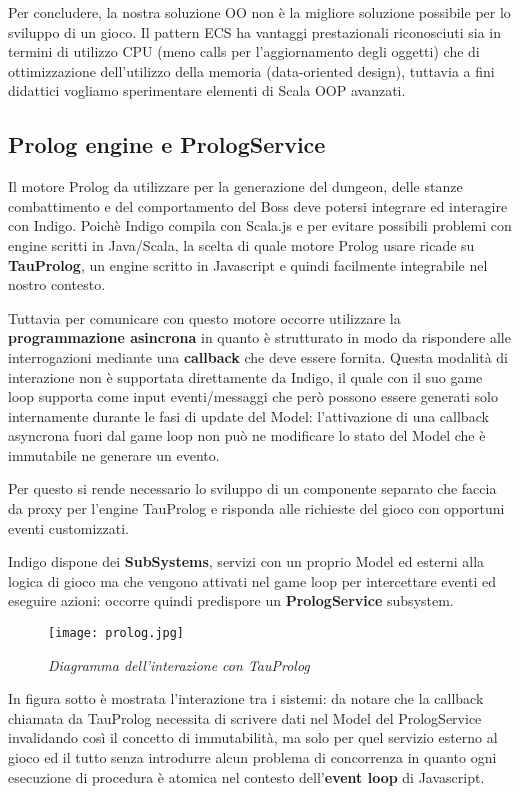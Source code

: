 Per concludere, la nostra soluzione OO non è la migliore soluzione possibile per lo sviluppo di un gioco. Il pattern ECS ha vantaggi prestazionali riconosciuti sia in termini di utilizzo CPU (meno calls per l'aggiornamento degli oggetti) che di ottimizzazione dell'utilizzo della memoria (data-oriented design), tuttavia a fini didattici vogliamo sperimentare elementi di Scala OOP avanzati.

\subsection{Prolog engine e PrologService}
Il motore Prolog da utilizzare per la generazione del dungeon, delle stanze combattimento e del comportamento del Boss deve potersi integrare ed interagire con Indigo.
Poichè Indigo compila con Scala.js e per evitare possibili problemi con engine scritti in Java/Scala, la scelta di quale motore Prolog usare ricade su \textbf{TauProlog}, un engine scritto in Javascript e quindi facilmente integrabile nel nostro contesto.

Tuttavia per comunicare con questo motore occorre utilizzare la \textbf{programmazione asincrona} in quanto è strutturato in modo da rispondere alle interrogazioni mediante una \textbf{callback} che deve essere fornita.
Questa modalità di interazione non è supportata direttamente da Indigo, il quale con il suo game loop supporta come input eventi/messaggi che però possono essere generati solo internamente durante le fasi di update del Model: l'attivazione di una callback asyncrona fuori dal game loop non può ne modificare lo stato del Model che è immutabile ne generare un evento.

Per questo si rende necessario lo sviluppo di un componente separato che faccia da proxy per l'engine TauProlog e risponda alle richieste del gioco con opportuni eventi customizzati.

Indigo dispone dei \textbf{SubSystems}, servizi con un proprio Model ed esterni alla logica di gioco ma che vengono attivati nel game loop per intercettare eventi ed eseguire azioni: occorre quindi predispore un \textbf{PrologService} subsystem.

\begin{figure}[!hbt]
    \centering
    \texttt{[image: prolog.jpg]}
    \caption{\textit{Diagramma dell'interazione con TauProlog}} 
\end{figure}

In figura sotto è mostrata l'interazione tra i sistemi: da notare che la callback chiamata da TauProlog necessita di scrivere dati nel Model del PrologService invalidando così il concetto di immutabilità, ma solo per quel servizio esterno al gioco ed il tutto senza introdurre alcun problema di concorrenza in quanto ogni esecuzione di procedura è atomica nel contesto dell'\textbf{event loop} di Javascript.


